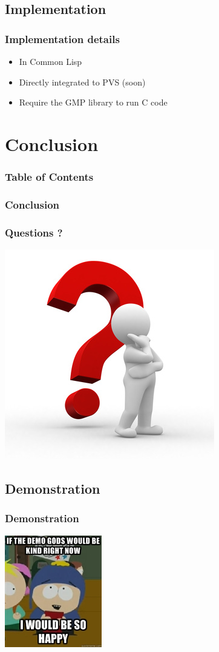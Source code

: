 \documentclass{beamer}
\begin{document}
\subsection{Implementation}

\begin{frame}
\frametitle{Implementation details}
\begin{itemize}
\itemsep2em
\item In Common Lisp
\item Directly integrated to PVS  (soon)
\item Require the GMP library to run C code
\end{itemize}

\end{frame}



\section{Conclusion}
\begin{frame}
\frametitle{Table of Contents}
\tableofcontents[currentsection]
\end{frame}

\begin{frame}
\frametitle{Conclusion}

\end{frame}



\begin{frame}
\frametitle{Questions ?}
\begin{center}
\includegraphics[scale=0.5]{includes/questions.jpg}
\end{center}
\end{frame}


\subsection{Demonstration}

\begin{frame}
\frametitle{Demonstration}
\begin{center}
\includegraphics[scale=1.5]{includes/demogods.jpg}
\end{center}
\end{frame}
\end{document}
